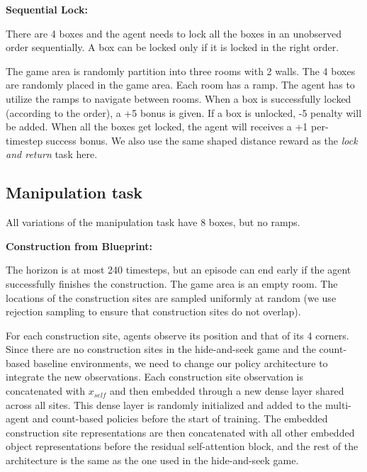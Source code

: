\textbf{Sequential Lock: } 

There are 4 boxes and the agent needs to lock all the boxes in an unobserved order sequentially. A box can be locked only if it is locked in the right order.

The game area is randomly partition into three rooms with 2 walls. The 4 boxes are randomly placed in the game area. Each room has a ramp. The agent has to utilize the ramps to navigate between rooms. When a box is successfully locked (according to the order), a +5 bonus is given. If a box is unlocked, -5 penalty will be added. When all the boxes get locked, the agent will receives a +1 per-timestep success bonus. We also use the same shaped distance reward as the \emph{lock and return} task here.


\subsection{Manipulation task}

All variations of the manipulation task have 8 boxes, but no ramps.

\textbf{Construction from Blueprint:}

The horizon is at most 240 timesteps, but an episode can end early if the agent successfully finishes the construction. The game area is an empty room. The locations of the construction sites are sampled uniformly at random (we use rejection sampling to ensure that construction sites do not overlap).

For each construction site, agents observe its position and that of its 4 corners. Since there are no construction sites in the hide-and-seek game and the count-based baseline environments, we need to change our policy architecture to integrate the new observations. Each construction site observation is concatenated with $x_{self}$ and then embedded through a new dense layer shared across all sites. This dense layer is randomly initialized and added to the multi-agent and count-based policies before the start of training. The embedded construction site representations are then concatenated with all other embedded object representations before the residual self-attention block, and the rest of the architecture is the same as the one used in the hide-and-seek game.


